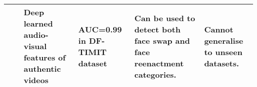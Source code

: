 \begin{table*}[htbp]
{\begin{tabular}{|p{2cm}|p{1cm}|p{5cm}|p{3cm}|p{5cm}|p{5cm}|}
                                   & \cite{cozzolino2023audio}           & Deep learned audio-visual features of authentic videos &  AUC=0.99 in DF-TIMIT dataset \cite{korshunov2018deepfakes}  & Can be used to detect both face swap and face reenactment categories.                                                                                                                                                                       & Cannot generalise to unseen datasets.                                                                 \\ \hline

\end{tabular}}
\label{tab:detection_summary}
\end{table*}






